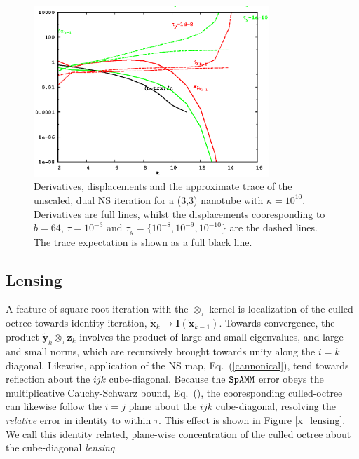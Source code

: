 \documentclass[letterpaper,twocolumn,amsmath,amsfont,amssymb,english,aps,jcp,preprintnumbers,groupaddress,nofootinbib,tightenlines]{revtex4}
\newcommand{\mat}[1]{\boldsymbol{#1}}
\newcommand{\ot}{ {\scriptstyle \otimes}_{ \tau } }
\begin{document}


\begin{figure}[h]
\includegraphics[width=3.5in]{fig_wtrbx_100_noscaling/wtrbx_100_noscale_dual.eps}
\caption{Derivatives, displacements and the approximate trace of the unscaled, dual NS iteration for a (3,3) nanotube with $\kappa =10^{10}$. 
Derivatives are full lines, whilst the displacements cooresponding to $b=64$, $\tau=10^{-3}$ and $\tau_y=\{10^{-8}, 10^{-9}, 10^{-10}\}$  
are the dashed lines.  The trace expectation is shown as a full black line. }
\end{figure}


\subsection{Lensing}
A feature of square root iteration with the $\ot$ kernel is localization of the culled octree towards identity iteration, 
$\widetilde{\mat{x}}_k \rightarrow \mat{I}\left( \widetilde{\mat{x}}_{k-1} \right)$.  Towards convergence,  
the product $\widetilde{\mat{y}}_k \ot \widetilde{\mat{z}}_k$ involves the product of large and small eigenvalues, and large and small norms, 
which are recursively brought towards unity along the $i=k$ diagonal.  Likewise, application of the NS map, Eq.~(\ref{cannonical}),  tend towards 
reflection about the $ijk$ cube-diagonal.   Because the $\tt SpAMM$ error obeys the multiplicative Cauchy-Schwarz bound, Eq.~(),  the 
cooresponding culled-octree can likewise follow the $i=j$ plane about the $ijk$ cube-diagonal, resolving the {\em relative} error in identity to within $\tau$.    This effect is shown in Figure \ref{x_lensing}.   
We call this identity related,  plane-wise concentration of the culled octree  about the cube-diagonal {\em lensing}.  
\end{document}

